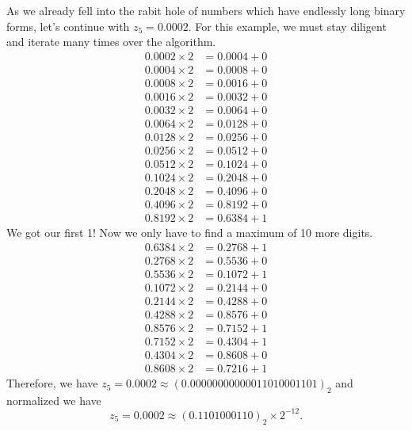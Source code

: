 %
\begin{exmp}
    As we already fell into the rabit hole of numbers which have endlessly long binary forms, let's continue with \(z_5 = 0.0002\). For this example, we must stay diligent and iterate many times over the algorithm.
    \begin{align*}
        0.0002 \times 2 &= 0.0004 + 0 \\
        0.0004 \times 2 &= 0.0008 + 0 \\
        0.0008 \times 2 &= 0.0016 + 0 \\
        0.0016 \times 2 &= 0.0032 + 0 \\
        0.0032 \times 2 &= 0.0064 + 0 \\
        0.0064 \times 2 &= 0.0128 + 0 \\
        0.0128 \times 2 &= 0.0256 + 0 \\
        0.0256 \times 2 &= 0.0512 + 0 \\
        0.0512 \times 2 &= 0.1024 + 0 \\
        0.1024 \times 2 &= 0.2048 + 0 \\
        0.2048 \times 2 &= 0.4096 + 0 \\
        0.4096 \times 2 &= 0.8192 + 0 \\
        0.8192 \times 2 &= 0.6384 + 1
    \end{align*}
    We got our first 1! Now we only have to find a maximum of 10 more digits.
    \begin{align*}
        0.6384 \times 2 &= 0.2768 + 1 \\
        0.2768 \times 2 &= 0.5536 + 0 \\
        0.5536 \times 2 &= 0.1072 + 1 \\
        0.1072 \times 2 &= 0.2144 + 0 \\
        0.2144 \times 2 &= 0.4288 + 0 \\
        0.4288 \times 2 &= 0.8576 + 0 \\
        0.8576 \times 2 &= 0.7152 + 1 \\
        0.7152 \times 2 &= 0.4304 + 1 \\
        0.4304 \times 2 &= 0.8608 + 0 \\
        0.8608 \times 2 &= 0.7216 + 1
    \end{align*}
    Therefore, we have \(z_5 = 0.0002 \approx (0.00000000000011010001101)_2\) and normalized we have
    \begin{equation*}
        z_5 = 0.0002 \approx (0.1101000110)_2 \times 2^{-12} \text{.}

\end{equation*}
\end{exmp}
